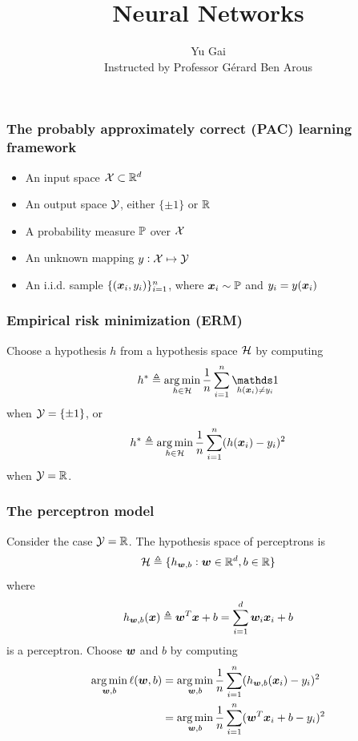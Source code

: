 \documentclass{beamer}
\title{Neural Networks}
\author{Yu Gai\\Instructed by Professor G\'erard Ben Arous}
\DeclareMathOperator*{\argmin}{arg\,min}
\DeclareMathOperator{\ind}{{\mathds 1}}
\begin{document}
\frame{\titlepage}

\begin{frame}

\frametitle{The probably approximately correct (PAC) learning framework}

\begin{itemize}
\item An input space ${\mathcal X} \subset {\mathbb R}^d$
\item An output space ${\mathcal Y}$, either $\{\pm 1\}$ or ${\mathbb R}$
\item A probability measure ${\mathbb P}$ over ${\mathcal X}$
\item An unknown mapping $y: {\mathcal X} \mapsto {\mathcal Y}$
\item An i.i.d. sample $\{({\bm x}_i, y_i)\}_{i = 1}^n$, where ${\bm x}_i \sim {\mathbb P}$ and $y_i = y({\bm x}_i)$
\end{itemize}

\end{frame}

\begin{frame}

\frametitle{Empirical risk minimization (ERM)}

Choose a hypothesis $h$ from a hypothesis space ${\mathcal H}$ by computing
\[
h^* \triangleq \argmin_{h \in \calh} \frac1n \sum_{i = 1}^n \ind_{h(\bmx_i) \ne y_i}
\]
when ${\mathcal Y} = \{\pm 1\}$, or
\[
h^* \triangleq \argmin_{h \in \calh} \frac1n \sum_{i = 1}^n (h(\bmx_i) - y_i)^2
\]
when ${\mathcal Y} = {\mathbb R}$.

\end{frame}

\begin{frame}

\frametitle{The perceptron model}

Consider the case ${\mathcal Y} = {\mathbb R}$.
The hypothesis space of perceptrons is
\[
{\mathcal H} \triangleq \{h_{{\bm w}, b} : {\bm w} \in {\mathbb R}^d, b \in {\mathbb R}\}
\]
where
\[
h_{{\bm w}, b} ({\bm x})
\triangleq {\bm w}^T {\bm x} + b
= \sum_{i = 1}^d {\bm w}_i {\bm x}_i + b
\]
is a perceptron.
Choose ${\bm w}$ and $b$ by computing
\begin{align*}
\argmin_{\bmw, b} \ell (\bmw, b)
& = \argmin_{\bmw, b} \frac1n \sum_{i = 1}^n (h_{\bmw, b} (\bmx_i) - y_i)^2 \\
& = \argmin_{\bmw, b} \frac1n \sum_{i = 1}^n (\bmw^T \bmx_i + b - y_i)^2
\end{align*}

\end{frame}
\end{document}
